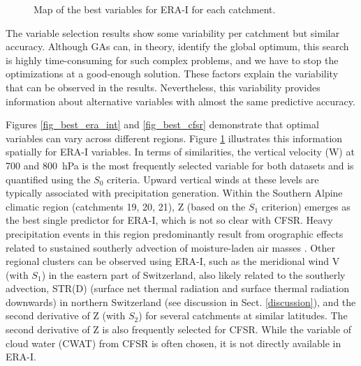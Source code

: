 \documentclass[draft]{agujournal2019}
\begin{document}
\begin{figure}[hbt]
	\noindent{}
	\caption{Map of the best variables for ERA-I for each catchment.}
	\label{fig_map_variables}
\end{figure}

The variable selection results show some variability per catchment but similar accuracy. Although GAs can, in theory, identify the global optimum, this search is highly time-consuming for such complex problems, and we have to stop the optimizations at a good-enough solution. These factors explain the variability that can be observed in the results. Nevertheless, this variability provides information about alternative variables with almost the same predictive accuracy.

Figures \ref{fig_best_era_int} and \ref{fig_best_cfsr} demonstrate that optimal variables can vary across different regions. Figure \ref{fig_map_variables} illustrates this information spatially for ERA-I variables. In terms of similarities, the vertical velocity (W) at 700 and 800~hPa is the most frequently selected variable for both datasets and is quantified using the $S_{0}$ criteria. Upward vertical winds at these levels are typically associated with precipitation generation. Within the Southern Alpine climatic region (catchments 19, 20, 21), Z (based on the $S_{1}$ criterion) emerges as the best single predictor for ERA-I, which is not so clear with CFSR. Heavy precipitation events in this region predominantly result from orographic effects related to sustained southerly advection of moisture-laden air masses \cite{Massacand1998}. Other regional clusters can be observed using ERA-I, such as the meridional wind V (with $S_{1}$) in the eastern part of Switzerland, also likely related to the southerly advection, STR(D) (surface net thermal radiation and surface thermal radiation downwards) in northern Switzerland (see discussion in Sect. \ref{discussion}), and the second derivative of Z (with $S_{2}$) for several catchments at similar latitudes. The second derivative of Z is also frequently selected for CFSR. While the variable of cloud water (CWAT) from CFSR is often chosen, it is not directly available in ERA-I.
\end{document}
